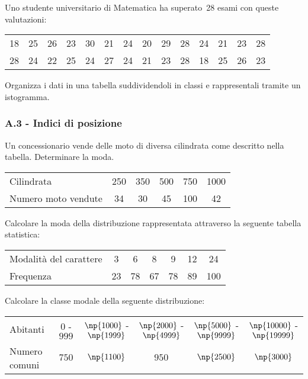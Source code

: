 \begin{esercizio}
\label{ese:A.20}
Uno studente universitario di Matematica ha superato~28 esami con queste valutazioni:
\begin{center}
 \begin{tabular}{cccccccccccccc}
18 & 25 & 26 & 23 & 30 & 21 & 24 & 20 & 29 & 28 & 24 & 21 & 23 & 28\\
28 & 24 & 22 & 25 & 24 & 27 & 24 & 21 & 23 & 28 & 18 & 25 & 26 & 23\\
 \end{tabular}
\end{center}
Organizza i dati in una tabella suddividendoli in classi e rappresentali tramite un istogramma.
\end{esercizio}

\subsubsection*{A.3 - Indici di posizione}

\begin{esercizio}
\label{ese:A.21}
Un concessionario vende delle moto di diversa cilindrata come descritto nella tabella.
Determinare la moda.
\begin{center}
\begin{tabular}{l*{5}{c}}
\toprule
Cilindrata & 250 &350 &500 &750 &1000\\
Numero moto vendute & 34 & 30 & 45 & 100 & 42 \\
\bottomrule
\end{tabular}
\end{center}
\end{esercizio}

\begin{esercizio}
\label{ese:A.22}
Calcolare la moda della distribuzione rappresentata attraverso la seguente tabella statistica:
\begin{center}
 \begin{tabular}{l*{6}{c}}
\toprule
Modalità del carattere & 3 & 6 & 8 & 9 & 12 & 24 \\
Frequenza & 23 & 78 & 67 & 78 & 89 & 100 \\
\bottomrule
\end{tabular}
\end{center}
\end{esercizio}

\begin{esercizio}
\label{ese:A.23}
Calcolare la classe modale della seguente distribuzione:
\begin{center}
\begin{tabular}{l*{5}{c}}
\toprule
Abitanti & 0 - $999$& $\np{1000}$ - $\np{1999}$& $\np{2000}$ - $\np{4999}$ & $\np{5000}$ - $\np{9999}$& $\np{10000}$ - $\np{19999}$ \\
Numero comuni & $750$ & $\np{1100}$ & $950$ & $\np{2500}$ & $\np{3000}$ \\
\bottomrule
\end{tabular}
\end{center}
\end{esercizio}

